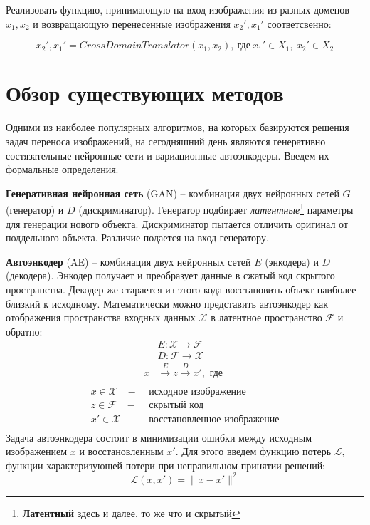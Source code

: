 \documentclass[11pt,a4paper]{extarticle}
\begin{document}
			\noindent
			Реализовать функцию, принимающую на вход изображения из разных доменов
			\(x_{1}, x_{2}\) и возвращающую перенесенные изображения \(x_{2}', x_{1}'\) соответсвенно: 

			\begin{equation}
					x_{2}', x_{1}'  = CrossDomainTranslator(x_{1}, x_{2}),\ \text{где}\ x_{1}' \in X_{1},\ x_{2}' \in X_{2}
			\end{equation}
	
	\newpage
	\section{Обзор существующих методов}
		
		Одними из наиболее популярных алгоритмов, на которых базируются решения задач переноса изображений, на сегодняшний день являются
		генеративно состязательные нейронные сети и вариационные автоэнкодеры. Введем их формальные определения.

		\textbf{Генеративная нейронная сеть} (GAN) -- комбинация двух нейронных сетей $G$ (генератор) и $D$ (дискриминатор).
		Генератор подбирает \textit{латентные}\footnote{
			\textbf{Латентный} здесь и далее, то же что и скрытый
		} параметры для генерации нового объекта.
		Дискриминатор пытается отличить оригинал от поддельного объекта. Различие подается на вход генератору.
		
		\textbf{Автоэнкодер} (AE) -- комбинация двух нейронных сетей $E$ (энкодера) и $D$ (декодера).
		Энкодер получает и преобразует данные в сжатый код скрытого пространства.
		Декодер же старается из этого кода восстановить объект наиболее близкий к исходному.
		Математически можно представить автоэнкодер как отображения пространства входных данных $\mathcal{X}$ в латентное пространство $\mathcal{F}$ и обратно:
		\begin{equation}
			\begin{aligned}
				& E\!:{\mathcal{X}}\rightarrow {\mathcal{F}} \\
				& D\!:{\mathcal{F}}\rightarrow {\mathcal{X}} \\
				x& \xrightarrow[]{E} z \xrightarrow[]{D} x', \text{ где }
			\end{aligned}
		\end{equation}
		\begin{equation*}
			\begin{array}{ll}
				x \in \mathcal{X}\;\;\;-&\text{исходное изображение}\\
				z \in \mathcal{F}\;\;\;-&\text{скрытый код}\\
				x'\in \mathcal{X}\;\;\;-&\text{восстановленное изображение}\\
			\end{array} 
		\end{equation*}
		Задача автоэнкодера состоит в минимизации ошибки между исходным изображением $x$ и восстановленным $x'$.
		Для этого введем функцию потерь $\mathcal{L}$, функции характеризующей потери при неправильном принятии решений:
		\begin{equation}
			\mathcal{L}(x,x') = \|x - x'\|^{2}
		\end{equation}
\end{document}
